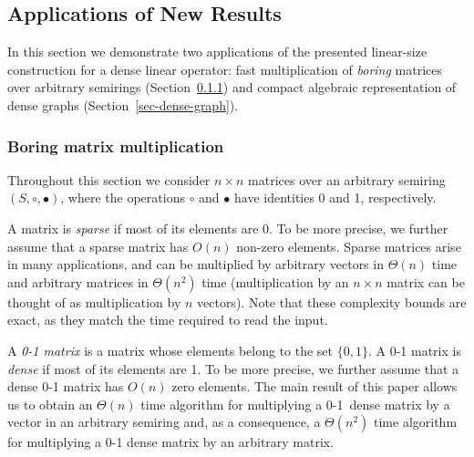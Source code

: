 \documentclass[11pt,letterpaper]{article}
\begin{document}

\subsection{Applications of New Results}
In this section we demonstrate two applications of the presented linear-size
construction for a dense linear operator: fast multiplication of \emph{boring}
matrices over arbitrary semirings (Section~\ref{sec-boring-matrices}) and
compact algebraic representation of dense graphs
(Section~\ref{sec-dense-graph}).

\subsubsection{Boring matrix multiplication}\label{sec-boring-matrices}

Throughout this section we consider $n \times n$ matrices over an arbitrary
semiring $(S, \circ, \bullet)$, where the operations $\circ$ and $\bullet$ have
identities 0 and 1, respectively.

A matrix is \emph{sparse} if most of its elements are 0. To be more precise, we
further assume that a sparse matrix has $O(n)$ non-zero elements. Sparse
matrices arise in many applications, and can be multiplied by arbitrary vectors
in $\Theta(n)$ time and arbitrary matrices in $\Theta(n^2)$ time (multiplication
by an $n\times n$ matrix can be thought of as multiplication by $n$ vectors).
Note that these complexity bounds are exact, as they match the time required to
read the input.

A \emph{0-1 matrix} is a matrix whose elements belong to the set $\{0,1\}$. A
0-1 matrix is \emph{dense} if most of its elements are 1. To be more precise, we
further assume that a dense 0-1 matrix has $O(n)$ zero elements. The main result
of this paper allows us to obtain an $\Theta(n)$ time algorithm for multiplying
a 0-1~dense matrix by a vector in an arbitrary semiring and, as a consequence, a
$\Theta(n^2)$ time algorithm for multiplying a 0-1 dense matrix by an arbitrary
matrix.
\end{document}
